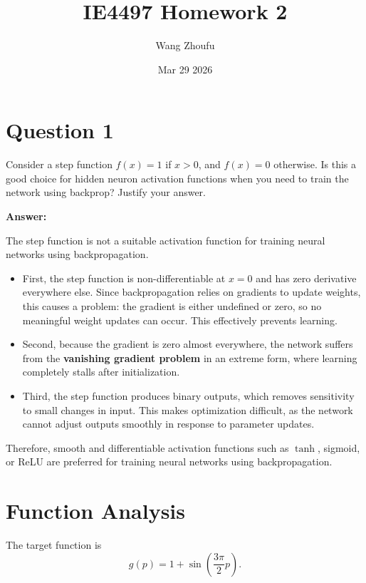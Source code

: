 \documentclass[11pt]{article}
\title{IE4497 Homework 2}
\author{Wang Zhoufu}
\date{Mar 29 2026}
\begin{document}
\sloppy

\maketitle

\section{Question 1}

Consider a step function $f(x) = 1$ if $x>0$, and $f(x) = 0$ otherwise. Is this a good choice for hidden neuron activation functions when you need to train the network using backprop? Justify your answer.

\textbf{Answer:} 

The step function is not a suitable activation function for training neural networks using backpropagation.

\begin{itemize}
    \item First, the step function is non-differentiable at $x=0$ and has zero derivative everywhere else. Since backpropagation relies on gradients to update weights, this causes a problem: the gradient is either undefined or zero, so no meaningful weight updates can occur. This effectively prevents learning.

    \item Second, because the gradient is zero almost everywhere, the network suffers from the \textbf{vanishing gradient problem} in an extreme form, where learning completely stalls after initialization.

    \item Third, the step function produces binary outputs, which removes sensitivity to small changes in input. This makes optimization difficult, as the network cannot adjust outputs smoothly in response to parameter updates.
\end{itemize}

Therefore, smooth and differentiable activation functions such as $\tanh$, sigmoid, or ReLU are preferred for training neural networks using backpropagation.

\section{Function Analysis}


The target function is
\begin{equation}
g(p) = 1 + \sin\left(\frac{3\pi}{2}p\right).
\end{equation} 
\end{document}

